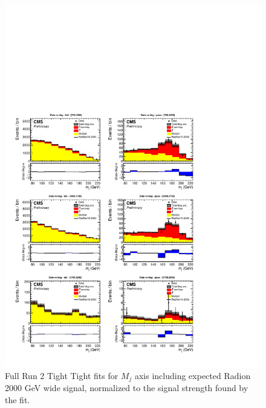 \begin{figure}[!htb]
	\centering
	\includegraphics[width=1\textwidth]{Figures/postfit_projx_fits_TTwide.pdf}
	\caption{Full Run 2 Tight Tight fits for $M_j$ axis including expected Radion 2000 GeV wide signal, normalized to the signal strength found by the fit.}
	\label{fig:TTmjwide}
\end{figure}
